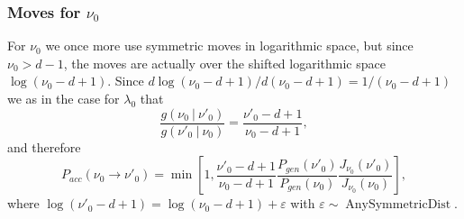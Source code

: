\documentclass[11pt, oneside]{article}   	%
\begin{document}
\subsubsection{Moves for $\nu_0$}
For $\nu_0$ we once more use symmetric moves in logarithmic space, but since $\nu_0 > d - 1$, the moves are actually over the shifted logarithmic space $\log(\nu_0 - d + 1)$. Since $d\log(\nu_0 - d + 1)/d(\nu_0 - d + 1) = 1/(\nu_0 - d + 1)$ we as in the case for $\lambda_0$ that
$$\frac{g(\nu_0~\vert~\nu'_0)}{g(\nu'_0~\vert~\nu_0)} = \frac{\nu'_0 - d + 1}{\nu_0 - d + 1},$$
and therefore
$$P_{acc}(\nu_0\rightarrow\nu'_0) = \min\left[1, \frac{\nu'_0 - d + 1}{\nu_0 - d + 1}\frac{P_{gen}(\nu'_{0})}{P_{gen}(\nu_{0})}\frac{J_{\nu_0}(\nu'_0)}{J_{\nu_0}(\nu_0)}\right],$$
where $\log(\nu'_0 - d + 1) = \log(\nu_0 - d + 1) + \varepsilon$ with $\varepsilon \sim\operatorname{AnySymmetricDist}$.
\end{document}
